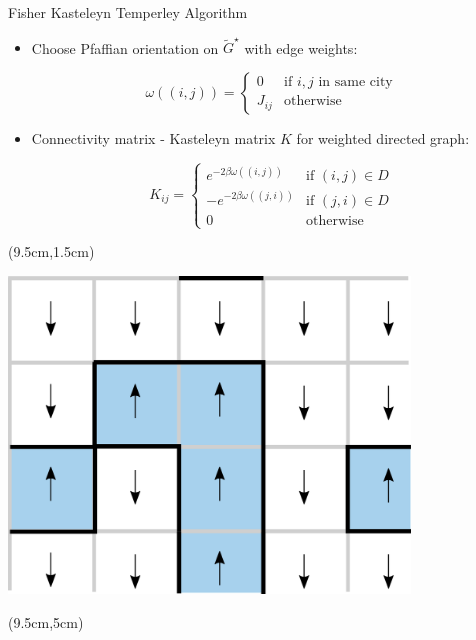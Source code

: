 \documentclass{dfki}
\begin{document}
\begin{frame}{Fisher Kasteleyn Temperley Algorithm}
{\begin{textblock*}{9cm}
\begin{itemize}
			\item Choose Pfaffian orientation on \( \tilde{G}^\star \) with edge weights:
			\begin{small}
			\[
			\omega((i,j)) =
			\begin{cases}
				0 & \text{if } i,j \text{ in same city} \\
				J_{ij} & \text{otherwise}
			\end{cases}
			\]
			\end{small}
			\item Connectivity matrix - Kasteleyn matrix \( K \) for weighted directed graph:
			\begin{small}
			\[
			K_{ij} =
			\begin{cases}
				e^{-2\beta \omega((i,j))} & \text{if } (i,j) \in D \\
				-e^{-2\beta \omega((j,i))} & \text{if } (j,i) \in D \\
				0 & \text{otherwise}
			\end{cases}
			\]
			\end{small}
		\end{itemize}
		\end{textblock*}
		\begin{textblock*}{5cm}(9.5cm,1.5cm)
			\begin{center}
				\includegraphics[width=0.8\textwidth]{fig/domain_wall_configuration.png}
			\end{center}
		\end{textblock*}
		\begin{textblock*}{5cm}(9.5cm,5cm)
			\begin{center}

\end{center}
\end{textblock*}}
\end{frame}
\end{document}
